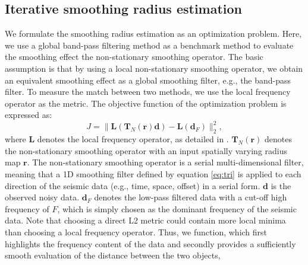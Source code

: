 \subsection{Iterative smoothing radius estimation}
We formulate the smoothing radius estimation as an optimization problem. Here, we use a global band-pass filtering method as a benchmark method to evaluate the smoothing effect  the non-stationary smoothing operator. The basic assumption is that by using a local non-stationary smoothing operator, we obtain an equivalent smoothing effect as a global smoothing filter, e.g., the band-pass filter. To measure the match between two methods, we use the local frequency operator \cite[]{fomel2007localattr} as the metric. The objective function of the optimization problem is expressed as:
\begin{equation}
\label{eq:robj}
J=\parallel \mathbf{L}(\mathbf{T}_N(\mathbf{r}) \mathbf{d}) -\mathbf{L}(\mathbf{d}_F)  \parallel_2^2,
\end{equation}
where $\mathbf{L}$ denotes the local frequency operator, as detailed in .  $\mathbf{T}_N(\mathbf{r})$ denotes the non-stationary smoothing operator with an input spatially varying radius map $\mathbf{r}$. The non-stationary smoothing operator is a serial multi-dimensional filter, meaning that a 1D smoothing filter defined by equation \ref{eq:tri} is applied to each direction of the seismic data (e.g., time, space, offset) in a serial form. 
 $\mathbf{d}$ is the observed noisy data. $\mathbf{d}_F$ denotes the low-pass filtered data with a cut-off high frequency of $F$, which is simply chosen as the dominant frequency of the seismic data.  Note that choosing a direct L2 metric could contain more local minima than choosing a local frequency operator. Thus, we  function, which first highlights the frequency content of the data and secondly provides a sufficiently smooth evaluation of the distance between the two objects, 

